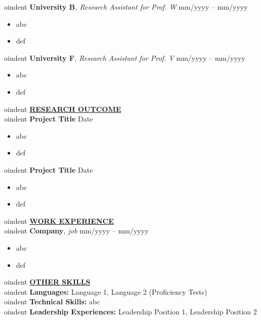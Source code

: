 \documentclass{article}
\begin{document}
oindent \textbf{University B}\textit{, Research Assistant for Prof. W} \hfill mm/yyyy -- mm/yyyy 
\begin{itemize}[noitemsep,nolistsep,leftmargin=*]
\item {abc}
\item {def}
\end{itemize}


oindent \textbf{University F}\textit{, Research Assistant for Prof. V} \hfill mm/yyyy -- mm/yyyy
\begin{itemize}[noitemsep,nolistsep,leftmargin=*]
\item {abc}
\item {def}
\end{itemize}


oindent \textbf{\underline{RESEARCH OUTCOME}} \\

oindent \textbf{Project Title} \hfill Date
\begin{itemize}[noitemsep,nolistsep,leftmargin=*]
\item {abc}
\item {def}
\end{itemize}


oindent \textbf{Project Title} \hfill Date
\begin{itemize}[noitemsep,nolistsep,leftmargin=*]
\item {abc}
\item {def}
\end{itemize}


oindent \textbf{\underline{WORK EXPERIENCE}} \\

oindent \textbf{Company}\textit{, job} \hfill mm/yyyy -- mm/yyyy
\begin{itemize}[noitemsep,nolistsep,leftmargin=*]
\item {abc}
\item {def}
\end{itemize}


oindent \textbf{\underline{OTHER SKILLS}} \\

oindent \textbf{Languages:} Language 1, Language 2 (Proficiency Tests) \\

oindent \textbf{Technical Skills:} abc \\

oindent \textbf{Leadership Experiences:} Leadership Position 1, Leadership Position 2 \\
\end{document}
